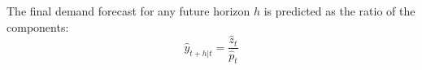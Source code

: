 \documentclass[12pt,a4paper,oneside]{report}
\begin{document}
The final demand forecast for any future horizon $h$ is predicted as the ratio of the components:
\begin{equation}
\hat{y}_{t+h|t} = \frac{\hat{z}_t}{\hat{p}_t}
\end{equation}














\end{document}
